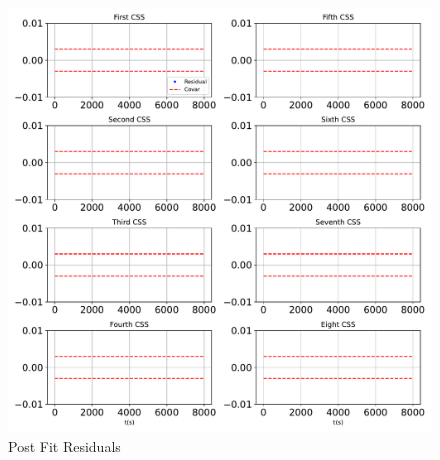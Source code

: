 \begin{figure}[htbp]\centerline{\includegraphics[height=0.9\textwidth, keepaspectratio]{AutoTeX/PostFitprop}}\caption{Post Fit Residuals}\label{fig:PostFitprop}\end{figure}